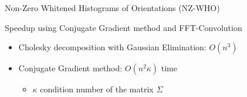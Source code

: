 \documentclass[serif,mathserif,final]{beamer}
\newcommand{\1}{\mathbb{I}} %
\begin{document}
\begin{frame}{}
\begin{columns}[t]
\begin{column}{0.24\linewidth}
\begin{block}{Non-Zero Whitened Histograms of Orientations (NZ-WHO)}

        \vspace{-1.0em}
      \end{block}

      \begin{block}{Speedup using Conjugate Gradient method and FFT-Convolution}
        \vspace{-1.0em}
        \begin{itemize}
          \item Cholesky decomposition with Gaussian Elimination: $O(n^3)$
          \item Conjugate Gradient method: $O(n^2\kappa)$ time
            \begin{itemize}
              \item $\kappa$ condition number of the matrix $\Sigma$
            \end{itemize}


\end{itemize}
\end{block}
\end{column}
\end{columns}
\end{frame}
\end{document}
